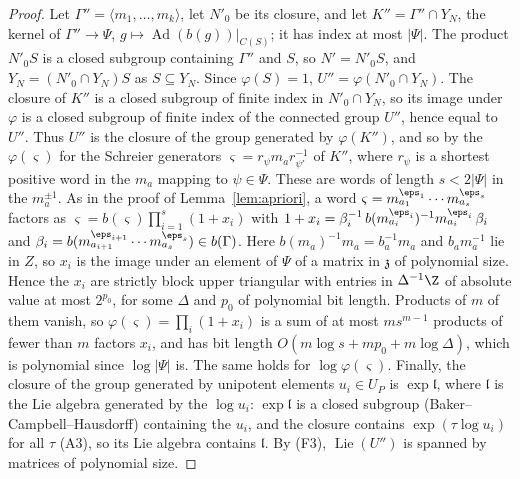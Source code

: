 \begin{proof}
Let $\Gamma''=\langle m_1,\ldots,m_k\rangle$, let $N'_0$ be its closure, and let $K''=\Gamma''\cap Y_N$, the kernel of
$\Gamma''\to\Psi$, $g\mapsto\operatorname{Ad}(b(g))|_{C(S)}$; it has index at most $|\Psi|$. The product $N'_0S$ is a closed
subgroup containing $\Gamma''$ and $S$, so $N'=N'_0S$, and $Y_N=(N'_0\cap Y_N)S$ as $S\subseteq Y_N$. Since
$\varphi(S)=1$, $U''=\varphi(N'_0\cap Y_N)$. The closure of $K''$ is a closed subgroup of finite index in
$N'_0\cap Y_N$, so its image under $\varphi$ is a closed subgroup of finite index of the connected group $U''$,
hence equal to $U''$. Thus $U''$ is the closure of the group generated by $\varphi(K'')$, and so by the
$\varphi(\varsigma)$ for the Schreier generators $\varsigma=r_\psi m_ar_{\psi'}^{-1}$ of $K''$, where $r_\psi$ is a
shortest positive word in the $m_a$ mapping to $\psi\in\Psi$. These are words of length $s<2|\Psi|$ in the
$m_a^{\pm1}$. As in the proof of Lemma~\ref{lem:apriori}, a word
$\varsigma=m_{a_1}^{\eps_1}\cdots m_{a_s}^{\eps_s}$ factors as $\varsigma=b(\varsigma)\prod_{i=1}^s(1+x_i)$ with
$1+x_i=\beta_i^{-1}\,b(m_{a_i}^{\eps_i})^{-1}m_{a_i}^{\eps_i}\,\beta_i$ and
$\beta_i=b(m_{a_{i+1}}^{\eps_{i+1}}\cdots m_{a_s}^{\eps_s})\in b(\Gamma)$. Here
$b(m_a)^{-1}m_a=b_a^{-1}m_a$ and $b_am_a^{-1}$ lie in $Z$, so $x_i$ is the image under an element of $\Psi$ of a
matrix in $\mathfrak z$ of polynomial size. Hence the $x_i$ are strictly block upper triangular with entries
in $\Delta^{-1}\Z$ of absolute value at most $2^{p_0}$, for some $\Delta$ and $p_0$ of polynomial bit length.
Products of $m$ of them vanish, so $\varphi(\varsigma)=\prod_i(1+x_i)$ is a sum of at most $ms^{m-1}$ products of
fewer than $m$ factors $x_i$, and has bit length $O(m\log s+mp_0+m\log\Delta)$, which is polynomial since
$\log|\Psi|$ is. The same holds for $\log\varphi(\varsigma)$. Finally, the closure of the group generated by
unipotent elements $u_i\in U_P$ is $\exp\mathfrak l$, where $\mathfrak l$ is the Lie algebra generated by the
$\log u_i$: $\exp\mathfrak l$ is a closed subgroup (Baker--Campbell--Hausdorff) containing the $u_i$, and the
closure contains $\exp(\tau\log u_i)$ for all $\tau$ (A3), so its Lie algebra contains $\mathfrak l$. By (F3),
$\operatorname{Lie}(U'')$ is spanned by matrices of polynomial size.
\end{proof}

